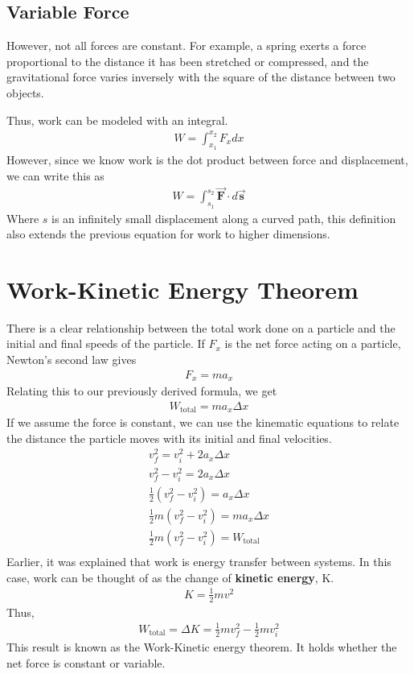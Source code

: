 \documentclass[11pt]{article}
\begin{document}
\subsection{Variable Force}
However, not all forces are constant. For example, a spring exerts a force proportional to the distance it has been stretched or compressed, and the gravitational force varies inversely with the square of the distance between two objects. 

Thus, work can be modeled with an integral.
\begin{align*}
    W = \int_{x_{1}}^{x_{2}} F_x dx 
\end{align*}
However, since we know work is the dot product between force and displacement, we can write this as
\begin{align*}
    W = \int_{s_1}^{s_2}\mathbf{\Vec{F}}\cdot d\mathbf{\Vec{s}}
\end{align*}
Where $s$ is an infinitely small displacement along a curved path, this definition also extends the previous equation for work to higher dimensions.

\section{Work-Kinetic Energy Theorem}

There is a clear relationship between the total work done on a particle and the initial and final speeds of the particle. If $F_x$ is the net force acting on a particle, Newton's second law gives
\begin{align*}
    F_x = ma_x
\end{align*}
Relating this to our previously derived formula, we get
\begin{align*}
    W_\text{total} = ma_x \Delta x
\end{align*}
If we assume the force is constant, we can use the kinematic equations to relate the distance the particle moves with its initial and final velocities.
\begin{align*}
    v_f^2 = v_i^2 + 2a_x\Delta x\\
    v_f^2 - v_i^2 = 2a_x\Delta x\\
    \frac{1}{2}(v_f^2 - v_i^2) = a_x\Delta x \\
    \frac{1}{2}m(v_f^2 - v_i^2) = ma_x\Delta x \\
    \frac{1}{2}m(v_f^2 - v_i^2) = W_\text{total} \\
\end{align*}
Earlier, it was explained that work is energy transfer between systems. In this case, work can be thought of as the change of \textbf{kinetic energy}, K.
\begin{align*}
    K = \frac{1}{2}mv^2
\end{align*}
Thus,
\begin{align*}
    W_\text{total} = \Delta K = \frac{1}{2}mv_f^2 - \frac{1}{2}mv_i^2
\end{align*}
This result is known as the Work-Kinetic energy theorem. It holds whether the net force is constant or variable. 
\end{document}
